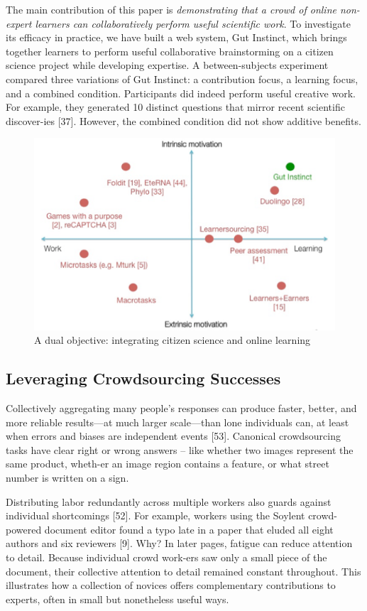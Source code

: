 The main contribution of this paper is \textit {demonstrating that a crowd of online non-expert learners can collaboratively perform useful scientific work}. To investigate its efficacy in practice, we have built a web system, Gut Instinct, which brings together learners to perform useful collaborative brainstorming on a citizen science project while developing expertise. A between-subjects experiment compared three variations of Gut Instinct: a contribution focus, a learning focus, and a combined condition. Participants did indeed perform useful creative work. For example, they generated 10 distinct questions that mirror recent scientific discover-ies [37]. However, the combined condition did not show additive benefits. 

\begin{figure}[h] 
  \centering
  \includegraphics[width=1.0\textwidth]{figures/gutinstinct/gi-2.png}
  \caption[]
{A dual objective: integrating citizen science and online learning}
  \label{fig:gi-2}
\end{figure}


\subsection{Leveraging Crowdsourcing Successes}
Collectively aggregating many people’s responses can produce faster, better, and more reliable results—at much larger scale—than lone individuals can, at least when errors and biases are independent events [53]. Canonical crowdsourcing tasks have clear right or wrong answers – like whether two images represent the same product, wheth-er an image region contains a feature, or what street number is written on a sign.

Distributing labor redundantly across multiple workers also guards against individual shortcomings [52]. For example, workers using the Soylent crowd-powered document editor found a typo late in a paper that eluded all eight authors and six reviewers [9]. Why? In later pages, fatigue can reduce attention to detail. Because individual crowd work-ers saw only a small piece of the document, their collective attention to detail remained constant throughout. This illustrates how a collection of novices offers complementary contributions to experts, often in small but nonetheless useful ways. 

